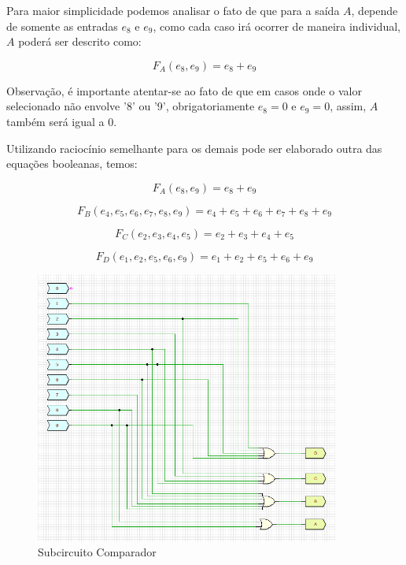 \documentclass[12pt]{article}
\begin{document}
Para maior simplicidade podemos analisar o fato de que para a saída
\textbf{$A$}, depende de somente as entradas $e_{8}$ e $e_{9}$, como cada caso
irá ocorrer de maneira individual, \textbf{$A$} poderá ser descrito como:

\begin{equation}
F_{A}(e_{8}, e_{9}) = e_{8} + e_{9}
\end{equation}

Observação, é importante atentar-se ao fato de que em casos onde o valor
selecionado não envolve '8' ou '9', obrigatoriamente $e_{8}=0$ e $e_{9}=0$,
assim, \textbf{$A$} também será igual a 0.

Utilizando raciocínio semelhante para os demais pode ser elaborado outra das
equações booleanas, temos:

\begin{equation}
F_{A}(e_{8}, e_{9}) = e_{8} + e_{9}
\end{equation}

\begin{equation}
F_{B}(e_{4},e_{5},e_{6},e_{7},e_{8},e_{9}) = e_{4}+e_{5}+e_{6}+e_{7}+e_{8}+e_{9}
\end{equation}

\begin{equation}
F_{C}(e_{2},e_{3},e_{4},e_{5}) = e_{2}+e_{3}+e_{4}+e_{5}
\end{equation}

\begin{equation}
F_{D}(e_{1},e_{2},e_{5},e_{6},e_{9}) = e_{1}+e_{2}+e_{5}+e_{6}+e_{9}
\end{equation}

\begin{figure}[H]
    \centering
    \includegraphics[width=10cm]{Exp05/2.1.png}
    \caption{Subcircuito Comparador}
    \label{fig:subComparador2.1}
\end{figure}
\end{document}
